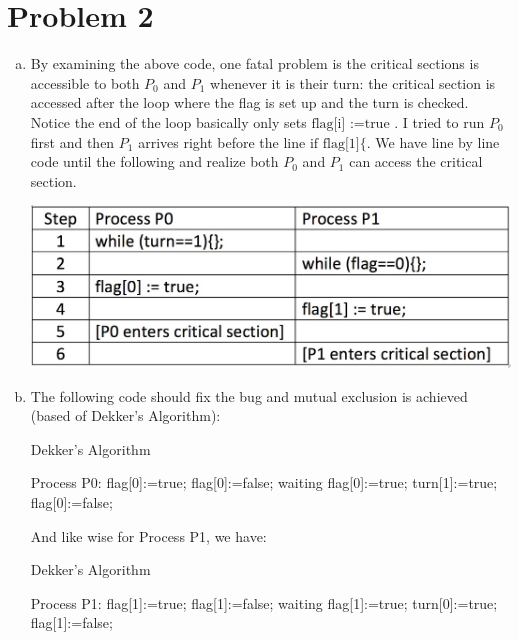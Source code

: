 \documentclass{article}   	                         %
\begin{document}
\section*{Problem 2}
\begin{enumerate}[(a)]
\item
By examining the above code, one fatal problem is the critical sections is accessible to both $P_0$ and $P_1$ whenever it is their turn: the critical section is accessed after the loop where the flag is set up and the turn is checked. Notice the end of the loop basically only sets $\text{flag[i] :=true }$. I tried to run $P_0$ first and then $P_1$ arrives right before the line $\text{if flag[1]\{}$. We have line by line code until the following and realize both $P_0$ and $P_1$ can access the critical section.\\
\begin{center}
\includegraphics[scale = 0.2]{Picture1.jpg}
\end{center}
\item
The following code should fix the bug and mutual exclusion is achieved (based of Dekker's Algorithm):
\begin{algorithm}
\caption{Dekker's Algorithm}\label{Process P0}
\begin{algorithmic}
   \State Process P0:
   \Repeat
    \State flag[0]:=true;
      \State flag[0]:=false;
       \State waiting
      \EndWhile
      \State flag[0]:=true;
    \EndIf
    \EndWhile
    \State turn[1]:=true;
    \State flag[0]:=false;
      \State       {}
\end{algorithmic}
\end{algorithm}
And like wise for Process P1, we have:\\
\begin{algorithm}
\caption{Dekker's Algorithm}\label{Process P1}
\begin{algorithmic}
   \State Process P1:
   \Repeat
    \State flag[1]:=true;
      \State flag[1]:=false;
       \State waiting
      \EndWhile
      \State flag[1]:=true;
    \EndIf
    \EndWhile
    \State turn[0]:=true;
    \State flag[1]:=false;
      \State       {}
\end{algorithmic}
\end{algorithm}
\end{enumerate}
\end{document}
